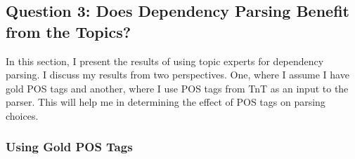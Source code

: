 


\subsection*{Question 3: Does Dependency Parsing Benefit from the Topics?}

In this section, I present the results of using topic experts for dependency parsing. I discuss my results from two perspectives. One, where I assume I have gold POS tags and another, where I use POS tags from TnT as an input to the parser. This will help me in determining the effect of POS tags on parsing choices. 

\subsubsection*{Using Gold POS Tags}\label{sec:goldpos}

